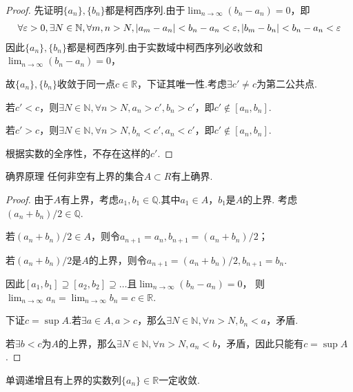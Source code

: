 \begin{proof}
    先证明\(\{a_n\},\{b_n\}\)都是柯西序列.由于\(\lim_{n \to \infty}(b_n-a_n)=0\)，即
    \begin{align*}
        \forall \varepsilon>0, \exists N \in \mathbb{N}, 
        \forall m,n>N, \abs*{a_m-a_n}<b_n-a_n<\varepsilon, \abs*{b_m-b_n}<b_n-a_n<\varepsilon
    \end{align*}
    因此\(\{a_n\},\{b_n\}\)都是柯西序列.由于实数域中柯西序列必收敛和\(\lim_{n \to \infty}(b_n-a_n)=0\)，

    故\(\{a_n\},\{b_n\}\)收敛于同一点\(c \in \mathbb{R}\)，下证其唯一性.考虑\(\exists c' \ne c\)为第二公共点.

    若\(c'<c\)，则\(\exists N \in \mathbb{N}, \forall n>N, a_n>c', b_n>c'\)，即\(c' \notin [a_n,b_n]\).

    若\(c'>c\)，则\(\exists N \in \mathbb{N}, \forall n>N, b_n<c', a_n<c'\)，即\(c' \notin [a_n,b_n]\).

    {\kaishu 根据实数的全序性，不存在这样的\(c'\).}
\end{proof}

\begin{theorem}\label{1.A.3} 确界原理 \:
    任何非空有上界的集合\(A \subset R\)有上确界.
\end{theorem}

\begin{proof}
    由于\(A\)有上界，考虑\(a_1,b_1 \in \mathbb{Q}\).其中\(a_1 \in A\)，\(b_1\)是\(A\)的上界.
    考虑\((a_n+b_n)/2 \in \mathbb{Q}\).

    若\((a_n+b_n)/2 \in A\)，则令\(a_{n+1}=a_n, b_{n+1}=(a_n+b_n)/2\)；

    若\((a_n+b_n)/2\)是\(A\)的上界，则令\(a_{n+1}=(a_n+b_n)/2, b_{n+1}=b_n\).

    因此\([a_1,b_1] \supseteq [a_2,b_2] \supseteq \dots\)且\(\lim_{n \to \infty}(b_n-a_n)=0\)，
    则\(\lim_{n \to \infty}a_n=\lim_{n \to \infty}b_n=c \in \mathbb{R}\).

    下证\(c=\sup A\).若\(\exists a \in A, a>c\)，那么\(\exists N \in \mathbb{N}, \forall n>N, b_n<a\)，矛盾.

    若\(\exists b<c\)为\(A\)的上界，那么\(\exists N \in \mathbb{N}, \forall n>N, a_n<b\)，矛盾，因此只能有\(c=\sup A\).
\end{proof}

\begin{theorem}\label{1.A.4}
    单调递增且有上界的实数列\(\{a_n\} \in \mathbb{R}\)一定收敛.
\end{theorem}

